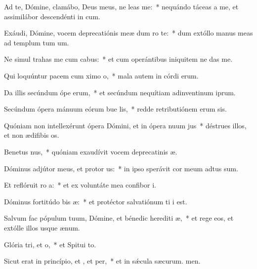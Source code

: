 \item Ad te, Dómine, clamábo, Deus meus, ne leas  me:~* nequándo táceas a me, et assimilábor descendénti in cum.
\item Exáudi, Dómine, vocem deprecatiónis meæ dum ro  te:~* dum extóllo manus meas ad templum tum um.
\item Ne simul trahas me cum cabus:~* et cum operántibus iniquitem ne das me.
\item Qui loquúntur pacem cum ximo o,~* mala autem in córdi erum.
\item Da illis secúndum ópe erum,~* et secúndum nequítiam adinventinum iprum.
\item Secúndum ópera mánuum eórum bue lis,~* redde retributiónem erum sis.
\item Quóniam non intellexérunt ópera Dómini, et in ópera nuum jus~* déstrues illos, et non ædifibis os.
\item Benetus nus,~* quóniam exaudívit vocem deprecatinis æ.
\item Dóminus adjútor meus, et protor us:~* in ipso sperávit cor meum  adtus sum.
\item Et reflóruit ro a:~* et ex voluntáte mea confibor i.
\item Dóminus fortitúdo bis æ:~* et protéctor salvatiónum ti i est.
\item Salvum fac pópulum tuum, Dómine, et bénedic herediti æ,~* et rege eos, et extólle illos usque  ænum.
\item Glória tri, et o,~* et Spitui to.
\item Sicut erat in princípio, et , et per,~* et in sǽcula sæcurum. men.
